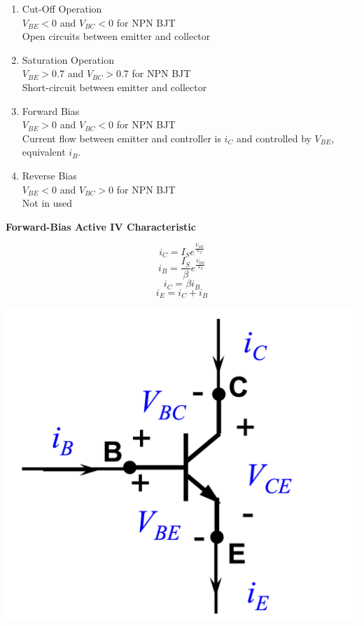 \begin{enumerate}
    \item Cut-Off Operation \\
    $V_{BE} <0$ and $V_{BC} < 0$ for NPN BJT\\
    Open circuits between emitter and collector
    \item Saturation Operation\\
    $V_{BE} > 0.7 $ and $V_{BC} > 0.7$ for NPN BJT\\
    Short-circuit between emitter and collector
    \item Forward Bias \\
    $V_{BE} > 0$ and $V_{BC} < 0$ for NPN BJT\\
    Current flow between emitter and controller is $i_C$ and controlled by $V_{BE}$, equivalent $i_B$.
    \item Reverse Bias \\
    $V_{BE} < 0$ and $V_{BC} > 0$ for NPN BJT\\
    Not in used 
\end{enumerate}
\newpage
\textbf{Forward-Bias Active IV Characteristic} \\
\begin{minipage}{0.65\textwidth}
    \begin{equation}
        i_C = I_{S} e^{\frac{V_{BE}}{V_T}}
    \end{equation}
    \begin{equation}
        i_B = \frac{I_S}{\beta} e^{\frac{V_{BE}}{V_T}}
    \end{equation}
    \begin{equation}
        i_C = \beta i_B
    \end{equation}
    \begin{equation}
        i_E=i_C+i_B
    \end{equation}
\end{minipage}
\begin{minipage}{0.35\textwidth}
    \includegraphics[width=1\linewidth]{image/npnbjt.png}
\end{minipage}

